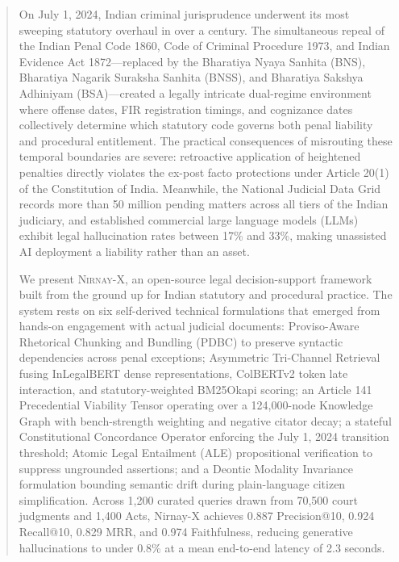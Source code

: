 \documentclass[conference]{IEEEtran}
\begin{document}
\begin{abstract}
On July 1, 2024, Indian criminal jurisprudence underwent its most sweeping statutory overhaul in over a century. The simultaneous repeal of the Indian Penal Code 1860, Code of Criminal Procedure 1973, and Indian Evidence Act 1872---replaced by the Bharatiya Nyaya Sanhita (BNS), Bharatiya Nagarik Suraksha Sanhita (BNSS), and Bharatiya Sakshya Adhiniyam (BSA)---created a legally intricate dual-regime environment where offense dates, FIR registration timings, and cognizance dates collectively determine which statutory code governs both penal liability and procedural entitlement. The practical consequences of misrouting these temporal boundaries are severe: retroactive application of heightened penalties directly violates the ex-post facto protections under Article 20(1) of the Constitution of India. Meanwhile, the National Judicial Data Grid records more than 50 million pending matters across all tiers of the Indian judiciary, and established commercial large language models (LLMs) exhibit legal hallucination rates between 17\% and 33\%, making unassisted AI deployment a liability rather than an asset.

We present \textsc{Nirnay-X}, an open-source legal decision-support framework built from the ground up for Indian statutory and procedural practice. The system rests on six self-derived technical formulations that emerged from hands-on engagement with actual judicial documents: Proviso-Aware Rhetorical Chunking and Bundling (PDBC) to preserve syntactic dependencies across penal exceptions; Asymmetric Tri-Channel Retrieval fusing InLegalBERT dense representations, ColBERTv2 token late interaction, and statutory-weighted BM25Okapi scoring; an Article 141 Precedential Viability Tensor operating over a 124,000-node Knowledge Graph with bench-strength weighting and negative citator decay; a stateful Constitutional Concordance Operator enforcing the July 1, 2024 transition threshold; Atomic Legal Entailment (ALE) propositional verification to suppress ungrounded assertions; and a Deontic Modality Invariance formulation bounding semantic drift during plain-language citizen simplification. Across 1,200 curated queries drawn from 70,500 court judgments and 1,400 Acts, Nirnay-X achieves 0.887 Precision@10, 0.924 Recall@10, 0.829 MRR, and 0.974 Faithfulness, reducing generative hallucinations to under 0.8\% at a mean end-to-end latency of 2.3 seconds.
\end{abstract}
\end{document}
